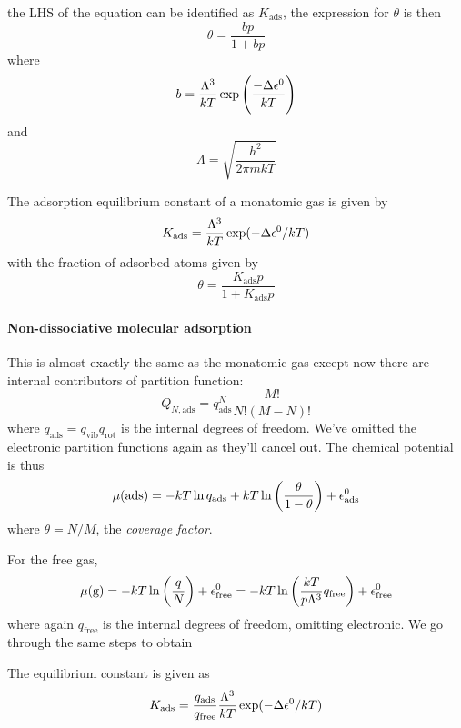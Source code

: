 the LHS of the equation can be identified as $K_{\text{ads}}$, the expression for $\theta$ is then
\begin{equation}
  \theta=\frac{bp}{1+bp}
\end{equation}
where
\begin{equation}
  b=\frac{\Lambda^3}{kT}\exp\left(\frac{-\Delta\epsilon^0}{kT} \right)
\end{equation}
and
\begin{equation}
  \Lambda=\sqrt{\frac{h^2}{2\pi mkT}}
\end{equation}
\begin{thrm}
The adsorption equilibrium constant of a monatomic gas is given by
\begin{equation}
  K_{\text{ads}}=\frac{\Lambda^3}{kT}\exp(-\Delta\epsilon^0/kT )
\end{equation}
with the fraction of adsorbed atoms given by
\begin{equation}
  \theta=\frac{K_{\text{ads}}p}{1+K_{\text{ads}}p}
\end{equation}
\end{thrm}
\paragraph{Non-dissociative molecular adsorption}
This is almost exactly the same as the monatomic gas except now there are internal contributors of partition function:
\begin{equation}
  Q_{N,\text{ads}}=q_{\text{ads}}^N\frac{M!}{N!(M-N)!}
\end{equation}
where $q_{\text{ads}}=q_{\text{vib}}q_{\text{rot}}$ is the internal degrees of freedom. We've omitted the electronic partition functions again as they'll cancel out. The chemical potential is thus
\begin{equation}
  \mu(\text{ads})=-kT\ln q_{\text{ads}}+kT\ln\left(\frac{\theta}{1-\theta} \right)+\epsilon^0_{\text{ads}}
\end{equation}
where $\theta=N/M$, the \emph{coverage factor}.\par
For the free gas,
\begin{equation}
  \mu(\text{g})=-kT\ln\left(\frac{q}{N} \right)+\epsilon^0_{\text{free}}=-kT\ln\left(\frac{kT}{p\Lambda^3}q_{\text{free}} \right)+\epsilon^0_{\text{free}}
\end{equation}
where again $q_{\text{free}}$ is the internal degrees of freedom, omitting electronic. We go through the same steps to obtain
\begin{thrm}
The equilibrium constant is given as
\begin{equation}
  K_{\text{ads}}=\frac{q_{\text{ads}}}{q_{\text{free}}}\frac{\Lambda^3}{kT}\exp(-\Delta\epsilon^0/kT )
\end{equation}
\end{thrm}
